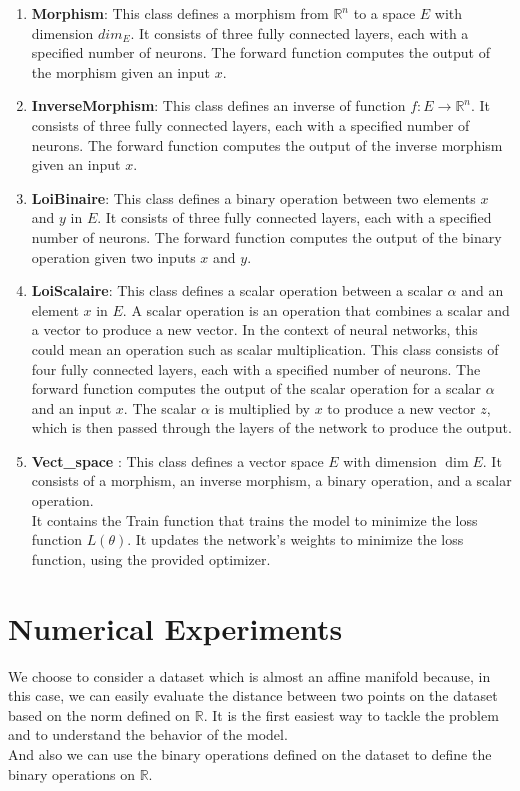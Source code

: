 \documentclass{report}
\begin{document}
    \begin{enumerate}
        \item \textbf{Morphism}: This class defines a morphism from 
        $\mathbb{R}^n$ to a space $E$ with dimension $dim_E$. 
        It consists of three fully connected layers, each with 
        a specified number of neurons. The forward function computes 
        the output of the morphism given an input $x$.
        \item \textbf{InverseMorphism}: This class defines an inverse
        of function $f: E \rightarrow \mathbb{R}^n$. It consists of
        three fully connected layers, each with a specified number
        of neurons. The forward function computes the output of the
        inverse morphism given an input $x$.
        \item \textbf{LoiBinaire}: This class defines a binary operation 
        between two elements $x$ and $y$ in $E$. It consists of three 
        fully connected layers, each with a specified number of neurons. 
        The forward function computes the output of the binary operation 
        given two inputs $x$ and $y$.
        \item \textbf{LoiScalaire}: 
        This class defines a scalar operation between a scalar $\alpha$ and an element $x$ in $E$. A scalar operation is an operation that combines a scalar and a vector to produce a new vector. In the context of neural networks, this could mean an operation such as scalar multiplication. This class consists of four fully connected layers, each with a specified number of neurons. The forward function computes the output of the scalar operation for a scalar $\alpha$ and an input $x$. The scalar $\alpha$ is multiplied by $x$ to produce a new vector $z$, which is then passed through the layers of the network to produce the output.
        \item \textbf{Vect\_space} : This class defines a vector space $E$ with dimension $\dim{E}$. It consists of a morphism, an inverse morphism, a binary operation, and a scalar operation. 
        \\ 
        It contains the Train function that trains the model to minimize the loss function $L(\theta)$. It updates the network's weights to minimize the loss function, using the provided optimizer. 
    \end{enumerate}


\section{Numerical Experiments}
    We choose to consider a dataset  which is almost an affine manifold because, in this case, we can easily evaluate the distance between two points on the dataset based on the norm defined on $\mathbb{R}$. It is the first easiest way to tackle the problem and to understand the behavior of the model.\\
    And also we can use the binary operations defined on the dataset to define the binary operations on $\mathbb{R}$.
\end{document}
